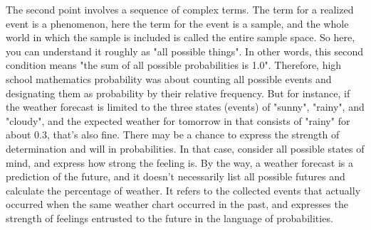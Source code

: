 \documentclass{ltjbook}
\begin{document}
The second point involves a sequence of complex terms. The term for a realized event is a phenomenon, here the term for the event is a sample, and the whole world in which the sample is included is called the entire sample space. So here, you can understand it roughly as "all possible things". In other words, this second condition means "the sum of all possible probabilities is 1.0". Therefore, high school mathematics probability was about counting all possible events and designating them as probability by their relative frequency. But for instance, if the weather forecast is limited to the three states (events) of "sunny", "rainy", and "cloudy", and the expected weather for tomorrow in that consists of "rainy" for about 0.3, that's also fine. There may be a chance to express the strength of determination and will in probabilities. In that case, consider all possible states of mind, and express how strong the feeling is. By the way, a weather forecast is a prediction of the future, and it doesn't necessarily list all possible futures and calculate the percentage of weather. It refers to the collected events that actually occurred when the same weather chart occurred in the past, and expresses the strength of feelings entrusted to the future in the language of probabilities.
\end{document}
